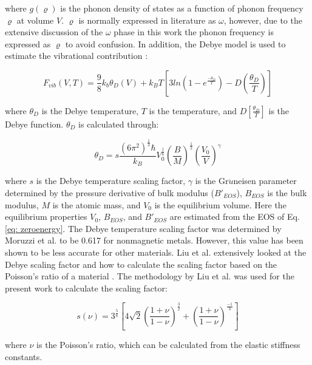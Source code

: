 \noindent where $g(\varrho)$ is the phonon density of states as a function of phonon frequency $\varrho$ at volume $V$. $\varrho$ is normally expressed in literature as $\omega$, however, due to the extensive discussion of the $\omega$ phase in this work the phonon frequency is expressed as $\varrho$ to avoid confusion. In addition, the Debye model is used to estimate the vibrational contribution \cite{Shang2010}: 

\begin{equation}
\label{eq: debye}
F_{vib}(V,T) = \frac{9}{8} k_{b} \theta_{D}(V) + k_{B}T \left[ 3 ln \left( 1 - e^{\frac{-\theta_{D}}{T}} \right) - D \left( \frac{\theta_D}{T} \right) \right] 
\end{equation}

\noindent where $\theta_{D}$ is the Debye temperature, $T$ is the temperature, and $D \left[ \frac{\theta_{D}}{T} \right] $ is the Debye function. $\theta_{D}$ is calculated through: 

\begin{equation}
\label{eq: debyetemp}
\theta_{D} = s \frac{(6\pi^2)^{\frac{1}{3}}\hbar}{k_B} V_{0}^{\frac{1}{6}} \left( \frac{B}{M} \right)^{\frac{1}{2}} \left( \frac{V_0}{V} \right)^{\gamma} 
\end{equation}

\noindent where $s$ is the Debye temperature scaling factor, $\gamma$ is the Gr$\ddot{u}$neisen parameter determined by the pressure derivative of bulk modulus ($B'_{EOS}$), $B_{EOS}$ is the bulk modulus, $M$ is the atomic mass, and $V_0$ is the equilibrium volume. Here the equilibrium properties $V_0$, $B_{EOS}$, and $B'_{EOS}$ are estimated from the EOS of Eq. \ref{eq: zeroenergy}. The Debye temperature scaling factor was determined by Moruzzi et al. \cite{Moruzzi1988} to be 0.617 for nonmagnetic metals. However, this value has been shown to be less accurate for other materials. Liu et al. extensively looked at the Debye scaling factor and how to calculate the scaling factor based on the Poisson's ratio of a material \cite{Liu2015}. The methodology by Liu et al. \cite{Liu2015} was used for the present work to calculate the scaling factor: 

\begin{equation}
\label{eq: debyescaling}
s(\nu) = 3^{\frac{5}{6}} \left[ 4\sqrt{2} \left( \frac{1 + \nu}{1 - \nu} \right)^{\frac{3}{2}} + \left( \frac{1 + \nu}{1 - \nu} \right)^{\frac{-1}{3}} \right]
\end{equation}

\noindent where $\nu$ is the Poisson's ratio, which can be calculated from the elastic stiffness constants.

